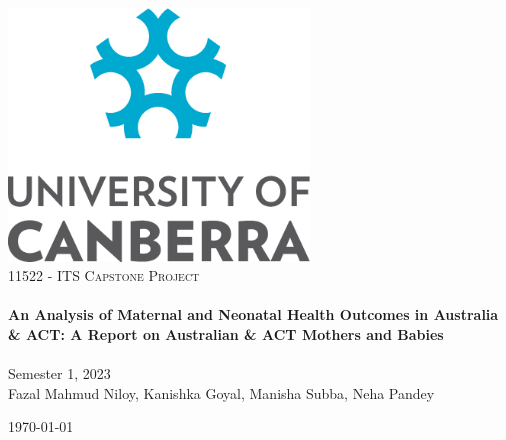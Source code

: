 \begin{titlepage}
    \vbox{ }

    \vbox{ }

    \begin{center}
        \includegraphics[width=0.6\textwidth]{img/Uc-logo.png}\\[4cm]
        \textsc{\Large 11522 - ITS Capstone Project}\\[0.7cm]

        \noindent\makebox[\linewidth]{\rule{.7\paperwidth}{.6pt}}\\[0.7cm]
        { \huge \bfseries An Analysis of Maternal and Neonatal Health Outcomes in Australia \& ACT: A Report on Australian \& ACT Mothers and Babies}\\[0.25cm]
        \noindent\makebox[\linewidth]{\rule{.7\paperwidth}{.6pt}}\\[0.7cm]
        \large{Semester 1, 2023}\\[1.2cm]
        \vfill
        \large
        Fazal Mahmud Niloy, Kanishka Goyal, Manisha Subba, Neha Pandey

        {\large \today}
    \end{center}
\end{titlepage}